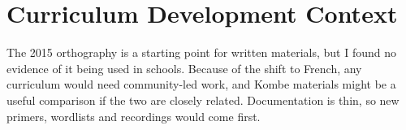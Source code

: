 \documentclass[12pt]{article}
\begin{document}
\section{Curriculum Development Context}
The 2015 orthography is a starting point for written materials, but I found no evidence of it being used in schools. Because of the shift to French, any curriculum would need community-led work, and Kombe materials might be a useful comparison if the two are closely related. Documentation is thin, so new primers, wordlists and recordings would come first.
\end{document}
